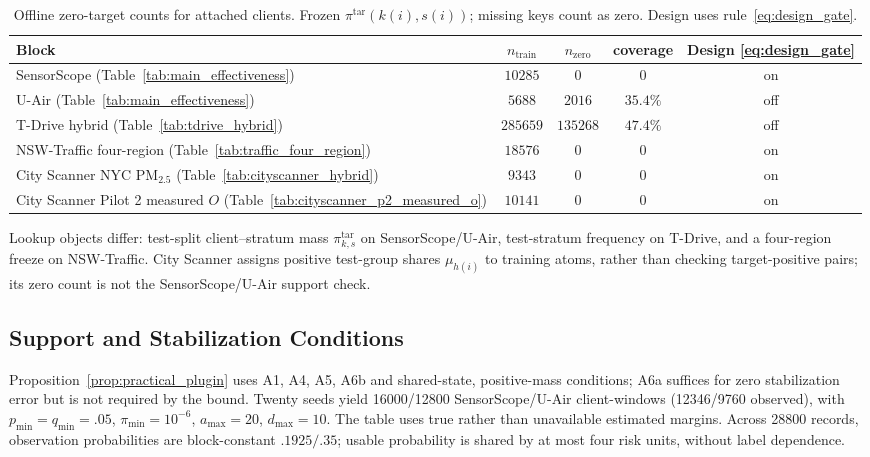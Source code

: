 \begin{table}[!htbp]
\centering
\caption{Offline zero-target counts for attached clients.
Frozen $\pi^{\mathrm{tar}}(k(i),s(i))$; missing keys count as zero.
Design uses rule~\eqref{eq:design_gate}.}
\label{tab:scd_phi_freeze}
\footnotesize
\setlength{\tabcolsep}{1pt}
\begin{tabular*}{\columnwidth}{@{\extracolsep{\fill}}lcccc}
\toprule
Block & $n_{\mathrm{train}}$ & $n_{\mathrm{zero}}$ & coverage & Design \eqref{eq:design_gate}\\
\midrule
SensorScope (Table~\ref{tab:main_effectiveness}) & $10285$ & $0$ & $0$ & on\\
U-Air (Table~\ref{tab:main_effectiveness}) & $5688$ & $2016$ & $35.4\%$ & off\\
T-Drive hybrid (Table~\ref{tab:tdrive_hybrid}) & $285659$ & $135268$ & $47.4\%$ & off\\
NSW-Traffic four-region (Table~\ref{tab:traffic_four_region}) & $18576$ & $0$ & $0$ & on\\
City Scanner NYC {PM}$_{2.5}$ (Table~\ref{tab:cityscanner_hybrid}) & $9343$ & $0$ & $0$ & on\\
\shortstack[l]{City Scanner Pilot 2\\measured $O$ (Table~\ref{tab:cityscanner_p2_measured_o})} & $10141$ & $0$ & $0$ & on\\
\bottomrule
\end{tabular*}
\end{table}

Lookup objects differ: test-split client--stratum mass
$\pi^{\mathrm{tar}}_{k,s}$ on SensorScope/U-Air, test-stratum frequency on
T-Drive, and a four-region freeze on NSW-Traffic. City Scanner assigns
positive test-group shares $\mu_{h(i)}$ to training atoms, rather than
checking target-positive pairs; its zero count is not the SensorScope/U-Air
support check.

\subsection{Support and Stabilization Conditions}
Proposition~\ref{prop:practical_plugin} uses A1, A4, A5, A6b and shared-state,
positive-mass conditions; A6a suffices for zero stabilization error but is not required by the bound. Twenty seeds yield 16000/12800 SensorScope/U-Air
client-windows (12346/9760 observed), with
$p_{\min}=q_{\min}=.05$, $\pi_{\min}=10^{-6}$, $a_{\max}=20$, $d_{\max}=10$.
The table uses true rather than unavailable estimated margins. Across 28800
records, observation probabilities are block-constant $.1925/.35$;
usable probability is shared by at most four risk units, without label dependence.

